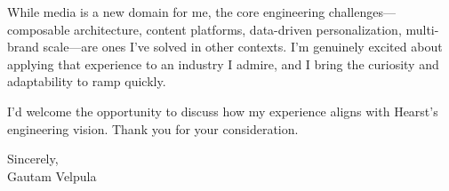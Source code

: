 \documentclass[11pt]{article}
\begin{document}
While media is a new domain for me, the core engineering challenges---composable architecture, content platforms, data-driven personalization, multi-brand scale---are ones I've solved in other contexts. I'm genuinely excited about applying that experience to an industry I admire, and I bring the curiosity and adaptability to ramp quickly.

I'd welcome the opportunity to discuss how my experience aligns with Hearst's engineering vision. Thank you for your consideration.

\vspace{16pt}

Sincerely, \\
Gautam Velpula
\end{document}

